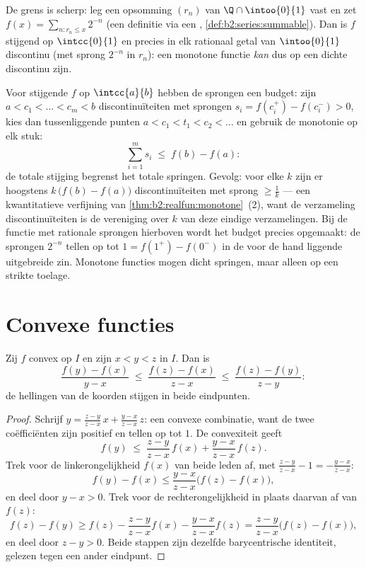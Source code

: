 \begin{example}
De grens is scherp: leg een opsomming $(r_n)$ van $\Q \cap
\intoo{0}{1}$ vast en zet $f(x) = \sum_{n : r_n \leq x} 2^{-n}$
(een definitie via een ,
\cref{def:b2:series:summable}). Dan is $f$ stijgend op
$\intcc{0}{1}$ en precies in elk rationaal getal van
$\intoo{0}{1}$ discontinu (met sprong $2^{-n}$ in $r_n$): een
monotone functie \emph{kan} dus op een dichte  discontinu zijn.
\end{example}

\begin{example}\label{ex:b2:realfun:jumpbudget}
Voor stijgende $f$ op $\intcc{a}{b}$ hebben de sprongen een budget:
zijn $a < c_1 < \dots < c_m < b$ discontinuïteiten met sprongen
$s_i = f(c_i^+) - f(c_i^-) > 0$, kies dan tussenliggende punten $a
< c_1 < t_1 < c_2 < \dots$ en gebruik de monotonie op elk stuk:
\[
\sum_{i=1}^{m} s_i \;\leq\; f(b) - f(a) :
\]
de totale stijging begrenst het totale springen. Gevolg: voor elke
$k$ zijn er hoogstens $k\,\bigl(f(b) - f(a)\bigr)$
discontinuïteiten met sprong $\geq \frac1k$ --- een kwantitatieve
verfijning van \cref{thm:b2:realfun:monotone}~(2), want de
verzameling discontinuïteiten is de  vereniging over $k$
van deze eindige verzamelingen. Bij de functie met rationale
sprongen hierboven wordt het budget precies opgemaakt: de sprongen
$2^{-n}$ tellen op tot $1 = f(1^+) - f(0^-)$ in de voor de hand
liggende uitgebreide zin. Monotone functies mogen dicht springen,
maar alleen op een strikte toelage.
\end{example}

\section{Convexe functies}

\begin{lemma}[Hellingsongelijkheid]\label{lem:b2:realfun:slopes}
Zij $f$ convex op $I$ en zijn $x < y < z$ in $I$. Dan is
\[
\frac{f(y) - f(x)}{y - x}
\;\leq\; \frac{f(z) - f(x)}{z - x}
\;\leq\; \frac{f(z) - f(y)}{z - y} :
\]
de hellingen van de koorden stijgen in beide eindpunten.
\end{lemma}

\begin{proof}
Schrijf $y = \frac{z - y}{z - x}\,x + \frac{y - x}{z - x}\,z$: een
convexe combinatie, want de twee coëfficiënten zijn positief en
tellen op tot $1$. De convexiteit geeft
\[
f(y) \;\leq\; \frac{z-y}{z-x}\,f(x) + \frac{y-x}{z-x}\,f(z).
\]
Trek voor de linkerongelijkheid $f(x)$ van beide leden af, met
$\frac{z-y}{z-x} - 1 = -\frac{y-x}{z-x}$:
\[
f(y) - f(x) \leq \frac{y - x}{z - x}\bigl(f(z) - f(x)\bigr),
\]
en deel door $y - x > 0$. Trek voor de rechterongelijkheid in
plaats daarvan af van $f(z)$:
\[
f(z) - f(y) \geq f(z) - \frac{z-y}{z-x}f(x) -
\frac{y-x}{z-x}f(z)
= \frac{z - y}{z - x}\bigl(f(z) - f(x)\bigr),
\]
en deel door $z - y > 0$. Beide stappen zijn dezelfde barycentrische
identiteit, gelezen tegen een ander eindpunt.
\end{proof}

